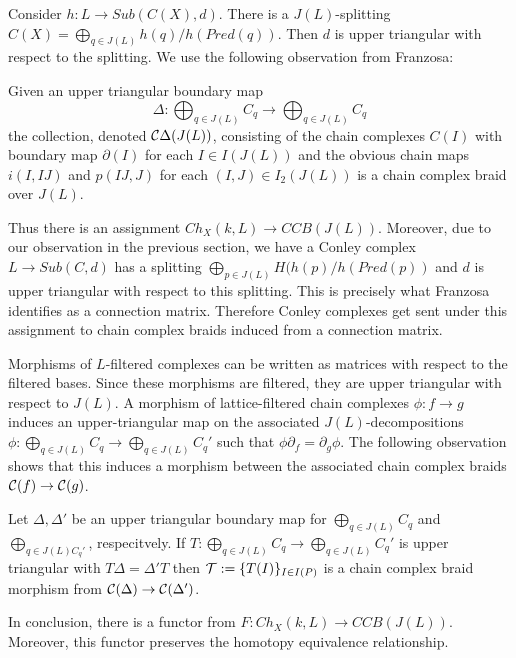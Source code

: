 Consider $h:L\to Sub(C(X),d)$.  There is a $J(L)$-splitting $C(X)=\bigoplus_{q\in J(L)} h(q)/h(Pred(q))$. Then $d$ is upper triangular with respect to the splitting.  We use the following observation from Franzosa:


\begin{prop}
Given an upper triangular boundary map $$\Delta:\bigoplus_{q\in J(L)} C_q\to \bigoplus_{q\in J(L)} C_q$$ the collection, denoted ${\mathcal C}\Delta(J(L))$, consisting of the chain complexes $C(I)$ with boundary map $\partial(I)$ for each $I\in I(J(L))$ and the obvious chain maps $i(I,IJ)$ and $p(IJ,J)$ for each $(I,J)\in I_2(J(L))$ is a chain complex braid over $J(L)$.
\end{prop}


Thus there is an assignment $Ch_X(k,L)\to CCB(J(L))$.   Moreover, due to our observation in the previous section, we have a Conley complex $L\to Sub(C,d)$ has a splitting $\bigoplus_{p\in J(L)} H(h(p)/h(Pred(p))$ and $d$ is upper triangular with respect to this splitting.  This is precisely what Franzosa identifies as a connection matrix.  Therefore Conley complexes get sent under this assignment to chain complex braids induced from a connection matrix.



Morphisms of $L$-filtered complexes can be written as matrices with respect to the filtered bases.   Since these morphisms are filtered, they are upper triangular with respect to $J(L)$.  A morphism of lattice-filtered chain complexes $\phi:f\to g$ induces an upper-triangular map on the associated $J(L)$-decompositions $\phi:\bigoplus_{q\in J(L)}C_q\to \bigoplus_{q\in J(L)} C_q'$ such that $\phi\partial_f = \partial_g\phi$.  The following observation shows that this induces a morphism between the associated chain complex braids ${\mathcal C}(f)\to {\mathcal C}(g)$.

\begin{prop}
Let $\Delta,\Delta'$ be an upper triangular boundary map for $\bigoplus_{q\in J(L)} C_q$ and $\bigoplus_{q\in J(L) C_q'}$, respecitvely.  If $T:\bigoplus_{q\in J(L)} C_q\to \bigoplus_{q\in J(L)} C_q'$ is upper triangular with $T\Delta = \Delta'T$ then ${\mathcal T}:=\{T(I)\}_{I\in I(P)}$ is a chain complex braid morphism from ${\mathcal C}(\Delta)\to {\mathcal C}(\Delta')$.
\end{prop}

In conclusion, there is a functor from $F:Ch_X(k,L)\to CCB(J(L))$.  Moreover, this functor preserves the homotopy equivalence relationship.

